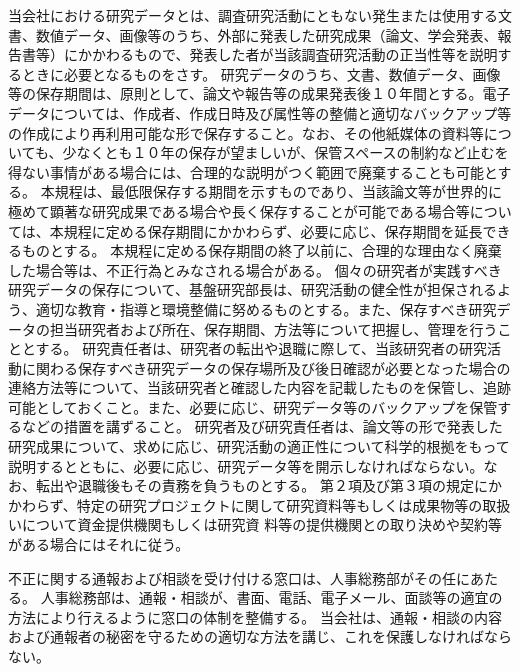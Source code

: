 \documentclass[10pt,a4paper,uplatex]{jsarticle}
\begin{document}
当会社における研究データとは、調査研究活動にともない発生または使用する文書、数値データ、画像等のうち、外部に発表した研究成果（論文、学会発表、報告書等）にかかわるもので、発表した者が当該調査研究活動の正当性等を説明するときに必要となるものをさす。
\term 研究データのうち、文書、数値データ、画像等の保存期間は、原則として、論文や報告等の成果発表後１０年間とする。電子データについては、作成者、作成日時及び属性等の整備と適切なバックアップ等の作成により再利用可能な形で保存すること。なお、その他紙媒体の資料等についても、少なくとも１０年の保存が望ましいが、保管スペースの制約など止むを得ない事情がある場合には、合理的な説明がつく範囲で廃棄することも可能とする。 
\term 本規程は、最低限保存する期間を示すものであり、当該論文等が世界的に極めて顕著な研究成果である場合や長く保存することが可能である場合等については、本規程に定める保存期間にかかわらず、必要に応じ、保存期間を延長できるものとする。
\term 本規程に定める保存期間の終了以前に、合理的な理由なく廃棄した場合等は、不正行為とみなされる場合がある。
\term 個々の研究者が実践すべき研究データの保存について、基盤研究部長は、研究活動の健全性が担保されるよう、適切な教育・指導と環境整備に努めるものとする。また、保存すべき研究データの担当研究者および所在、保存期間、方法等について把握し、管理を行うこととする。
\term 研究責任者は、研究者の転出や退職に際して、当該研究者の研究活動に関わる保存すべき研究データの保存場所及び後日確認が必要となった場合の連絡方法等について、当該研究者と確認した内容を記載したものを保管し、追跡可能としておくこと。また、必要に応じ、研究データ等のバックアップを保管するなどの措置を講ずること。
\term 研究者及び研究責任者は、論文等の形で発表した研究成果について、求めに応じ、研究活動の適正性について科学的根拠をもって説明するとともに、必要に応じ、研究データ等を開示しなければならない。なお、転出や退職後もその責務を負うものとする。
\term 第２項及び第３項の規定にかかわらず、特定の研究プロジェクトに関して研究資料等もしくは成果物等の取扱いについて資金提供機関もしくは研究資
料等の提供機関との取り決めや契約等がある場合にはそれに従う。

不正に関する通報および相談を受け付ける窓口は、人事総務部がその任にあたる。
\term 人事総務部は、通報・相談が、書面、電話、電子メール、面談等の適宜の方法により行えるように窓口の体制を整備する。
\term 当会社は、通報・相談の内容および通報者の秘密を守るための適切な方法を講じ、これを保護しなければならない。
\end{document}
